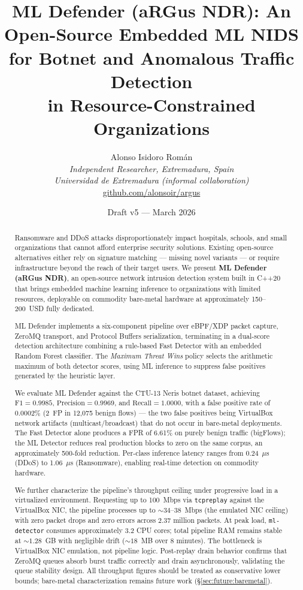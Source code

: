 \documentclass[11pt,a4paper]{article}
\title{\textbf{ML Defender (aRGus NDR): An Open-Source Embedded ML NIDS\\
for Botnet and Anomalous Traffic Detection\\
in Resource-Constrained Organizations}}
\author{
  Alonso Isidoro Rom\'an\\
  \textit{Independent Researcher, Extremadura, Spain}\\
  \textit{Universidad de Extremadura (informal collaboration)}\\
  \href{https://github.com/alonsoir/argus}{github.com/alonsoir/argus}
}
\date{Draft v5 --- March 2026}
\begin{document}

\maketitle

\begin{abstract}
Ransomware and DDoS attacks disproportionately impact hospitals, schools, and small
organizations that cannot afford enterprise security solutions. Existing open-source
alternatives either rely on signature matching --- missing novel variants --- or require
infrastructure beyond the reach of their target users. We present \textbf{ML Defender
(aRGus NDR)}, an open-source network intrusion detection system built in C++20 that brings
embedded machine learning inference to organizations with limited resources, deployable on
commodity bare-metal hardware at approximately 150--200~USD fully dedicated.

ML Defender implements a six-component pipeline over eBPF/XDP packet capture, ZeroMQ
transport, and Protocol Buffers serialization, terminating in a dual-score detection
architecture combining a rule-based Fast Detector with an embedded Random Forest classifier.
The \emph{Maximum Threat Wins} policy selects the arithmetic maximum of both detector scores,
using ML inference to suppress false positives generated by the heuristic layer.

We evaluate ML Defender against the CTU-13 Neris botnet dataset, achieving
$\text{F1} = 0.9985$, $\text{Precision} = 0.9969$, and $\text{Recall} = 1.0000$,
with a false positive rate of 0.0002\% (2~FP in 12,075 benign flows) --- the two false
positives being VirtualBox network artifacts (multicast/broadcast) that do not occur in
bare-metal deployments. The Fast Detector alone produces a FPR of 6.61\% on purely benign
traffic (bigFlows); the ML Detector reduces real production blocks to zero on the same
corpus, an approximately 500-fold reduction. Per-class inference latency ranges from
0.24~$\mu$s (DDoS) to 1.06~$\mu$s (Ransomware), enabling real-time detection on commodity
hardware.

We further characterize the pipeline's throughput ceiling under progressive load in a
virtualized environment. Requesting up to 100~Mbps via \texttt{tcpreplay} against the
VirtualBox NIC, the pipeline processes up to ${\sim}34$--38~Mbps (the emulated NIC ceiling)
with zero packet drops and zero errors across 2.37 million packets. At peak load,
\texttt{ml-detector} consumes approximately 3.2 CPU cores; total pipeline RAM remains stable
at ${\sim}1.28$~GB with negligible drift (${\sim}18$~MB over 8 minutes). The bottleneck is
VirtualBox NIC emulation, not pipeline logic. Post-replay drain behavior confirms that
ZeroMQ queues absorb burst traffic correctly and drain asynchronously, validating the queue
stability design. All throughput figures should be treated as conservative lower bounds;
bare-metal characterization remains future work (\S\ref{sec:future:baremetal}).


\end{abstract}
\end{document}
